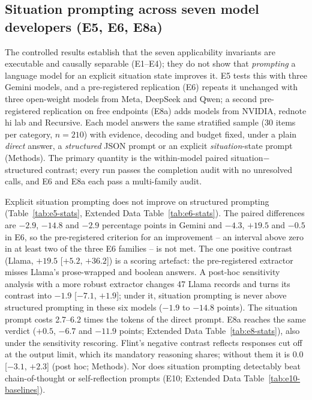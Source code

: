 \subsection*{Situation prompting across seven model developers (E5, E6, E8a)}

The controlled results establish that the seven applicability invariants are
executable and causally separable (E1--E4); they do not show that
\emph{prompting} a language model for an explicit situation state improves it.
E5 tests this with three Gemini models, and a pre-registered replication (E6)
repeats it unchanged with three open-weight models from Meta, DeepSeek and
Qwen; a second pre-registered replication on free endpoints (E8a) adds models
from NVIDIA, rednote hi lab and Recursive. Each model answers the same stratified sample (30 items per category,
$n=210$) with evidence, decoding and budget fixed, under a plain \emph{direct}
answer, a \emph{structured} JSON prompt or an explicit \emph{situation}-state
prompt (Methods). The primary quantity is the within-model paired
situation$-$structured contrast; every run passes the completion audit with no
unresolved calls, and E6 and E8a each pass a multi-family audit.



Explicit situation prompting does not improve on structured prompting
(Table~\ref{tab:e5-stats}, Extended Data Table~\ref{tab:e6-stats}). The
paired differences are $-2.9$, $-14.8$ and $-2.9$ percentage points in Gemini
and $-4.3$, $+19.5$ and $-0.5$ in E6, so the pre-registered criterion for an
improvement -- an interval above zero in at least two of the three E6 families
-- is not met. The one positive contrast (Llama, $+19.5$ [$+5.2$, $+36.2$]) is a
scoring artefact: the pre-registered extractor misses Llama's prose-wrapped and
boolean answers. A post-hoc sensitivity analysis with a more robust extractor
changes 47 Llama records and turns its contrast into $-1.9$ [$-7.1$, $+1.9$];
under it, situation prompting is never above structured prompting in these six models
($-1.9$ to $-14.8$ points). The situation prompt costs 2.7--6.2 times
the tokens of the direct prompt. E8a reaches the same verdict ($+0.5$, $-6.7$
and $-11.9$ points; Extended Data Table~\ref{tab:e8-stats}), also under the
sensitivity rescoring. Flint's negative contrast reflects responses cut off at
the output limit, which its mandatory reasoning shares; without them it is
$0.0$ [$-3.1$, $+2.3$] (post hoc; Methods). Nor does situation prompting detectably beat
chain-of-thought or self-reflection prompts (E10; Extended Data
Table~\ref{tab:e10-baselines}).

